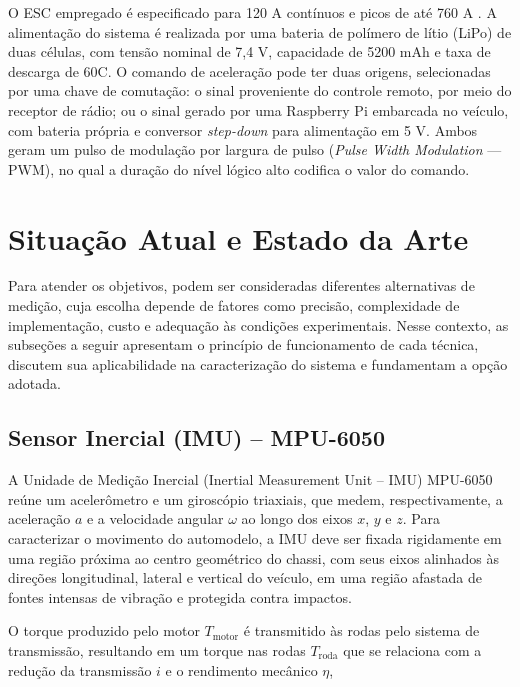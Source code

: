 O ESC empregado é especificado para 120 A contínuos e picos de até 760 A \cite{orion_vortex_r8}.
A alimentação do sistema é realizada por uma bateria de polímero de lítio (LiPo) de duas células, com tensão nominal de 7,4 V,
capacidade de 5200 mAh e taxa de descarga de 60C. O comando de aceleração 
pode ter duas origens, selecionadas por uma chave de comutação: o sinal
proveniente do controle remoto, por meio do receptor de rádio; ou o sinal
gerado por uma Raspberry Pi embarcada no veículo, com bateria própria e conversor
\emph{step-down} para alimentação em 5 V. Ambos geram um pulso de modulação por largura de
pulso (\emph{Pulse Width Modulation} — PWM), no qual a duração do nível lógico alto codifica o valor do comando.

\section{Situação Atual e Estado da Arte}
\label{sec:estadoarte}

Para atender os objetivos, podem ser consideradas
diferentes alternativas de medição, cuja escolha depende de fatores
como precisão, complexidade de implementação, custo e adequação às condições experimentais.
Nesse contexto, as subseções a seguir apresentam o princípio de funcionamento de cada técnica,
discutem sua aplicabilidade na caracterização do sistema e fundamentam a opção adotada.

\subsection{Sensor Inercial (IMU) -- MPU-6050}
\label{sec:imu}

A Unidade de Medição Inercial (Inertial Measurement Unit -- IMU) MPU-6050 reúne um acelerômetro 
e um giroscópio triaxiais, que medem, respectivamente, a aceleração \(a\) e a velocidade 
angular \(\omega\) ao longo dos eixos \(x\), \(y\) e \(z\). Para caracterizar o movimento do automodelo, 
a IMU deve ser fixada rigidamente em uma região próxima ao centro geométrico do
chassi, com seus eixos alinhados às direções longitudinal, lateral e vertical do veículo,
em uma região afastada de fontes intensas de vibração e protegida contra impactos.

O torque produzido pelo motor \(T_{\mathrm{motor}}\) é transmitido às rodas pelo sistema de transmissão, 
resultando em um torque nas rodas \(T_{\mathrm{roda}}\) que se relaciona com a redução da transmissão \(i\) e o 
rendimento mecânico \(\eta\),

